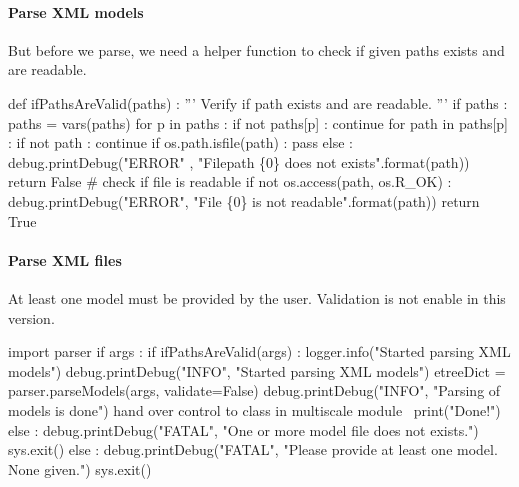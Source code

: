 \documentclass[]{article}%
\begin{document}
\paragraph{Parse XML models}

  But before we parse, we need a helper function to check if given paths exists
  and are readable.

\nwenddocs{}\endmoddef\nwstartdeflinemarkup{}\nwenddeflinemarkup
def ifPathsAreValid(paths) :
  ''' Verify if path exists and are readable. '''
  if paths :
    paths = vars(paths)
    for p in paths :
      if not paths[p] : continue
      for path in paths[p] :
        if not path : continue
        if os.path.isfile(path) : pass
        else :
          debug.printDebug("ERROR"
            , "Filepath \{0\} does not exists".format(path))
          return False
      # check if file is readable 
      if not os.access(path, os.R_OK) :
        debug.printDebug("ERROR", "File \{0\} is not readable".format(path))
  return True

\eatline
{}\nwendcode{}\nwdocspar

\paragraph{Parse XML files}

  At least one model must be provided by the user.  Validation is not enable in
  this version. 

\nwenddocs{}\endmoddef\nwstartdeflinemarkup{}\nwenddeflinemarkup
import parser
if args : 
  if ifPathsAreValid(args) :
    logger.info("Started parsing XML models")
    debug.printDebug("INFO", "Started parsing XML models")
    etreeDict = parser.parseModels(args, validate=False)
    debug.printDebug("INFO", "Parsing of models is done")
    \LA{}hand over control to class in multiscale module~{\nwtagstyle{}}\RA{}
    print("Done!")
  else :
    debug.printDebug("FATAL", "One or more model file does not exists.")
    sys.exit()
else :
  debug.printDebug("FATAL", "Please provide at least one model. None given.")
  sys.exit()
\end{document}
